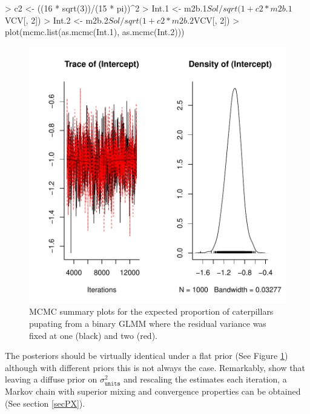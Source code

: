 \documentclass{article}
\begin{document}
\begin{Schunk}
\begin{Sinput}
> c2 <- ((16 * sqrt(3))/(15 * pi))^2
> Int.1 <- m2b.1$Sol/sqrt(1 + c2 * m2b.1$VCV[, 2])
> Int.2 <- m2b.2$Sol/sqrt(1 + c2 * m2b.2$VCV[, 2])
> plot(mcmc.list(as.mcmc(Int.1), as.mcmc(Int.2)))
\end{Sinput}
\end{Schunk}

\begin{figure}[!h]
\begin{center}
\includegraphics{Lecture2-072}
\end{center}
\caption{MCMC summary plots for the expected proportion of caterpillars pupating from  a binary GLMM where the residual variance was fixed at one (black) and two (red).}
\label{ICI-fig}
\end{figure}

The posteriors should be virtually identical under a flat prior (See Figure \ref{ICI-fig}) although with different priors this is not always the case. Remarkably, \citep{vanDyk.2001} show that leaving a diffuse prior on $\sigma^{2}_{\texttt{units}}$ and rescaling the estimates each iteration, a Markov chain with superior mixing and convergence properties can be obtained (See section \ref{secPX}).\\  
\end{document}

